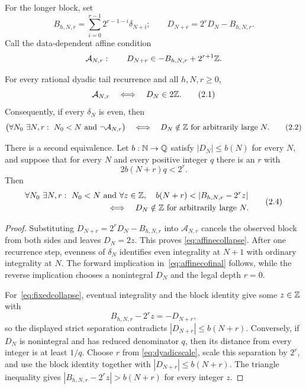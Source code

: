 \documentclass[11pt]{article}
\begin{document}
For the longer block, set
\[
 B_{h,N,r}=\sum_{i=0}^{r-1}2^{r-1-i}\delta_{N+i};
 \qquad D_{N+r}=2^rD_N-B_{h,N,r}.
\]
Call the data-dependent affine condition
\[
 \mathcal A_{N,r}:\qquad
 D_{N+r}\in -B_{h,N,r}+2^{r+1}\mathbb{Z}.
\]

\begin{theorem}\label{res:affinecollapse}
For every rational dyadic tail recurrence and all $h,N,r\ge0$,
\[
 \mathcal A_{N,r}\quad\Longleftrightarrow\quad D_N\in2\Z.
\tag{2.1}\label{eq:affinecollapse}
\]
Consequently, if every $\delta_N$ is even, then
\[
 \bigl(\forall N_0\ \exists N,r:\ N_0<N\text{ and }\neg\mathcal A_{N,r}\bigr)
 \quad\Longleftrightarrow\quad
 D_N\notin\Z\text{ for arbitrarily large }N.
\tag{2.2}\label{eq:affinecofinal}
\]

There is a second equivalence.  Let $b:\mathbb{N}\to\mathbb{Q}$ satisfy
$|D_N|\le b(N)$ for every $N$, and suppose that for every $N$ and every
positive integer $q$ there is an $r$ with
\[
 2b(N+r)q<2^r.
\tag{2.3}\label{eq:dyadicscale}
\]
Then
\[
 \begin{split}
 &\forall N_0\ \exists N,r:\ N_0<N\text{ and }
   \forall z\in\Z,\quad
   b(N+r)<|B_{h,N,r}-2^rz|\\
 &\hspace{35mm}\Longleftrightarrow\quad
 D_N\notin\Z\text{ for arbitrarily large }N.
 \end{split}
\tag{2.4}\label{eq:fixedcollapse}
\]
\end{theorem}

\begin{proof}
Substituting $D_{N+r}=2^rD_N-B_{h,N,r}$ into $\mathcal A_{N,r}$ cancels the
observed block from both sides and leaves $D_N=2z$.  This proves
\eqref{eq:affinecollapse}.  After one recurrence step, evenness of
$\delta_N$ identifies even integrality at $N+1$ with ordinary integrality at
$N$.  The forward implication in~\eqref{eq:affinecofinal} follows, while the
reverse implication chooses a nonintegral $D_N$ and the legal depth $r=0$.

For~\eqref{eq:fixedcollapse}, eventual integrality and the block identity give
some $z\in\mathbb{Z}$ with
\[
 B_{h,N,r}-2^rz=-D_{N+r},
\]
so the displayed strict separation contradicts $|D_{N+r}|\le b(N+r)$.
Conversely, if $D_N$ is nonintegral and has reduced denominator $q$, then its
distance from every integer is at least $1/q$.  Choose $r$ from
\eqref{eq:dyadicscale}, scale this separation by $2^r$, and use the block
identity together with $|D_{N+r}|\le b(N+r)$.  The triangle inequality gives
$|B_{h,N,r}-2^rz|>b(N+r)$ for every integer $z$.
\end{proof}
\end{document}
